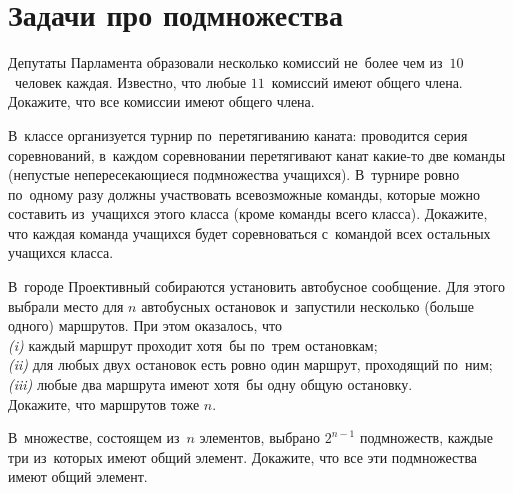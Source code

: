 
\section*{Задачи про подмножества}


\begin{problems}

\item
Депутаты Парламента образовали несколько комиссий не~более чем из~$10$~человек
каждая.
Известно, что любые $11$~комиссий имеют общего члена.
Докажите, что все комиссии имеют общего члена.


\item
В~классе организуется турнир по~перетягиванию каната: проводится серия
соревнований, в~каждом соревновании перетягивают канат какие-то две команды
(непустые непересекающиеся подмножества учащихся).
В~турнире ровно по~одному разу должны участвовать всевозможные команды, которые
можно составить из~учащихся этого класса (кроме команды всего класса).
Докажите, что каждая команда учащихся будет соревноваться с~командой всех
остальных учащихся класса.

\item
{}%
В~городе Проективный собираются установить автобусное сообщение.
Для этого выбрали место для $n$ автобусных остановок и~запустили несколько
(больше одного) маршрутов.
При этом оказалось, что
\\
\textit{(i)}
каждый маршрут проходит хотя~бы по~трем остановкам;
\\
\textit{(ii)}
для любых двух остановок есть ровно один маршрут, проходящий по~ним;
\\
\textit{(iii)}
любые два маршрута имеют хотя~бы одну общую остановку.
\\
Докажите, что маршрутов тоже $n$.

\item
В~множестве, состоящем из~$n$ элементов, выбрано $2^{n-1}$ подмножеств, каждые
три из~которых имеют общий элемент.
Докажите, что все эти подмножества имеют общий элемент.


\end{problems}
